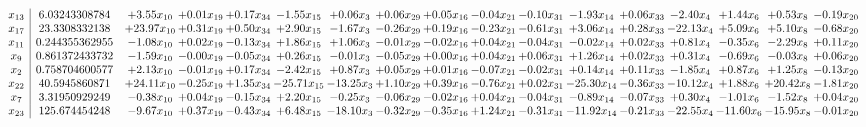 \documentclass[9pt]{article}
\begin{document}
 \[\begin{array}{c| c c@{\hskip 2pt} c@{\hskip 2pt} c@{\hskip 2pt} c@{\hskip 2pt} c@{\hskip 2pt} c@{\hskip 2pt} c@{\hskip 2pt} c@{\hskip 2pt} c@{\hskip 2pt} c@{\hskip 2pt} c@{\hskip 2pt} c@{\hskip 2pt} c@{\hskip 2pt} c@{\hskip 2pt} c@{\hskip 2pt} }
 x_{13}   &  6.03243308784 & +  3.55 x_{10} & +  0.01 x_{19} & +  0.17 x_{34} & -1.55 x_{15} & +  0.06 x_{3} & +  0.06 x_{29} & +  0.05 x_{16} & -0.04 x_{21} & -0.10 x_{31} & -1.93 x_{14} & +  0.06 x_{33} & -2.40 x_{4} & +  1.44 x_{6} & +  0.53 x_{8} & -0.19 x_{20}\\
 x_{17}   &  23.3308332138 & + 23.97 x_{10} & +  0.31 x_{19} & +  0.50 x_{34} & +  2.90 x_{15} & -1.67 x_{3} & -0.26 x_{29} & +  0.19 x_{16} & -0.23 x_{21} & -0.61 x_{31} & +  3.06 x_{14} & +  0.28 x_{33} & -22.13 x_{4} & +  5.09 x_{6} & +  5.10 x_{8} & -0.68 x_{20}\\
 x_{11}   &  0.244355362955 & -1.08 x_{10} & +  0.02 x_{19} & -0.13 x_{34} & +  1.86 x_{15} & +  1.06 x_{3} & -0.01 x_{29} & -0.02 x_{16} & +  0.04 x_{21} & -0.04 x_{31} & -0.02 x_{14} & +  0.02 x_{33} & +  0.81 x_{4} & -0.35 x_{6} & -2.29 x_{8} & +  0.11 x_{20}\\
 x_{9}   &  0.861372433732 & -1.59 x_{10} & -0.00 x_{19} & -0.05 x_{34} & +  0.26 x_{15} & -0.01 x_{3} & -0.05 x_{29} & +  0.00 x_{16} & +  0.04 x_{21} & +  0.06 x_{31} & +  1.26 x_{14} & +  0.02 x_{33} & +  0.31 x_{4} & -0.69 x_{6} & -0.03 x_{8} & +  0.06 x_{20}\\
 x_{2}   &  0.758704600577 & +  2.13 x_{10} & -0.01 x_{19} & +  0.17 x_{34} & -2.42 x_{15} & +  0.87 x_{3} & +  0.05 x_{29} & +  0.01 x_{16} & -0.07 x_{21} & -0.02 x_{31} & +  0.14 x_{14} & +  0.11 x_{33} & -1.85 x_{4} & +  0.87 x_{6} & +  1.25 x_{8} & -0.13 x_{20}\\
 x_{22}   &  40.5945860871 & + 24.11 x_{10} & -0.25 x_{19} & +  1.35 x_{34} & -25.71 x_{15} & -13.25 x_{3} & +  1.10 x_{29} & +  0.39 x_{16} & -0.76 x_{21} & +  0.02 x_{31} & -25.30 x_{14} & -0.36 x_{33} & -10.12 x_{4} & +  1.88 x_{6} & + 20.42 x_{8} & -1.81 x_{20}\\
 x_{7}   &  3.31950929249 & -0.38 x_{10} & +  0.04 x_{19} & -0.15 x_{34} & +  2.20 x_{15} & -0.25 x_{3} & -0.06 x_{29} & -0.02 x_{16} & +  0.04 x_{21} & -0.04 x_{31} & -0.89 x_{14} & -0.07 x_{33} & +  0.30 x_{4} & -1.01 x_{6} & -1.52 x_{8} & +  0.04 x_{20}\\
 x_{23}   &  125.674454248 & -9.67 x_{10} & +  0.37 x_{19} & -0.43 x_{34} & +  6.48 x_{15} & -18.10 x_{3} & -0.32 x_{29} & -0.35 x_{16} & +  1.24 x_{21} & -0.31 x_{31} & -11.92 x_{14} & -0.21 x_{33} & -22.55 x_{4} & -11.60 x_{6} & -15.95 x_{8} & -0.01 x_{20}\\

\end{array}\]
\end{document}
